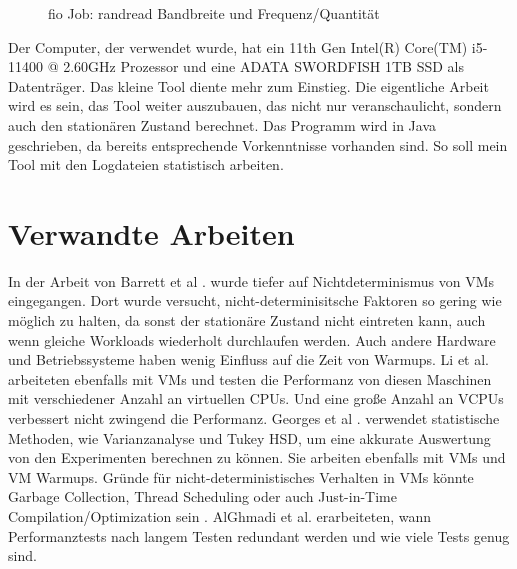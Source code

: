 \documentclass{article}
\begin{document}
\begin{figure}%
    \centering
    \qquad
    \caption{fio Job: randread Bandbreite und Frequenz/Quantität}%
    \label{fig:log_graphs}%
\end{figure}


Der Computer, der verwendet wurde, hat ein 11th Gen Intel(R) Core(TM) i5-11400 @ 2.60GHz Prozessor und eine ADATA SWORDFISH 1TB SSD  als Datenträger.
Das kleine Tool diente mehr zum Einstieg. Die eigentliche Arbeit wird es sein, das Tool weiter auszubauen, das nicht nur veranschaulicht,
sondern auch den stationären Zustand berechnet.
Das Programm wird in Java geschrieben, da bereits entsprechende Vorkenntnisse vorhanden sind.
So soll mein Tool mit den Logdateien statistisch arbeiten.

\newpage
\section{Verwandte Arbeiten}
In der Arbeit von Barrett et al \cite{vmsHotandCold}. wurde tiefer auf Nichtdeterminismus von VMs eingegangen.
Dort wurde versucht, nicht-determinisitsche Faktoren so gering wie möglich zu halten, da sonst der stationäre Zustand nicht eintreten kann, auch wenn gleiche Workloads wiederholt durchlaufen werden. Auch  andere Hardware und Betriebssysteme haben wenig Einfluss auf die Zeit von Warmups. Li et al. \cite{9256518} arbeiteten ebenfalls mit VMs und testen die Performanz von diesen Maschinen mit verschiedener Anzahl an virtuellen CPUs. Und eine große Anzahl an VCPUs verbessert nicht zwingend die Performanz.
Georges et al \cite{10.1145/1297027.1297033}. verwendet statistische Methoden, wie Varianzanalyse und Tukey HSD, um eine akkurate Auswertung von den Experimenten berechnen zu können. Sie arbeiten ebenfalls mit VMs und VM Warmups.
Gründe für nicht-deterministisches Verhalten in VMs könnte Garbage Collection, Thread Scheduling oder auch Just-in-Time Compilation/Optimization sein \cite{stasticsInPerformance}.
AlGhmadi et al. erarbeiteten, wann Performanztests nach langem Testen redundant werden und wie viele Tests genug sind.
\end{document}
